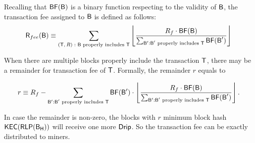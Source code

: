 Recalling that $\mathsf{BF}(\textsf{B})$ is a binary function respecting to the validity of $\textsf{B}$,
 the transaction fee assigned to $\textsf{B}$ is defined as follows:
\begin{align}\label{eq:txfee}
	\textsf{R}_{fee}(\textsf{B})\equiv
		 \sum_{\text{$(\textsf{T},R):$ $\textsf{B}$ properly includes $\textsf{T}$}}
		 \left\lfloor
	\frac{R_f \cdot\mathsf{BF}(\textsf{B})}{\sum_{\textsf{B}': \text{$\textsf{B}'$ properly includes $\textsf{T}$}} \mathsf{BF}(\textsf{B}') }
		 \right\rfloor
\end{align}

When there are multiple blocks properly include the transaction $\textsf{T}$, there may be a remainder for transaction fee of $\textsf{T}$. Formally, the remainder $r$ equals to

\begin{align}
	r\equiv R_f - \sum_{\textsf{B}': \text{$\textsf{B}'$ properly includes $\textsf{T}$}} \mathsf{BF}(\textsf{B}') \cdot \left\lfloor\frac{R_f \cdot\mathsf{BF}(\textsf{B})}{\sum_{\textsf{B}': \text{$\textsf{B}'$ properly includes $\textsf{T}$}} \mathsf{BF}(\textsf{B}') }\right\rfloor.
\end{align}

In case the remainder is non-zero, the blocks with $r$ minimum block hash $\mathsf{KEC}(\mathsf{RLP}(\textsf{B}_{\textsf{H}}))$ will receive one more ${\sf Drip}$. So the transaction fee can be exactly distributed to miners. 


